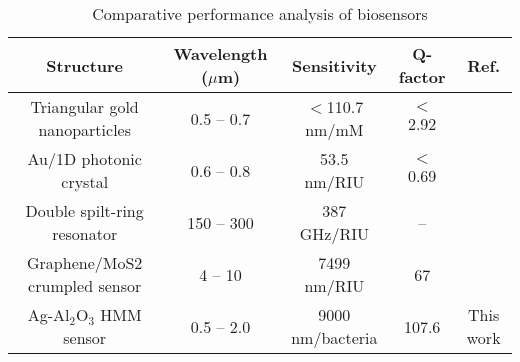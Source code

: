 \begin{table*}[htbp]
\caption{Comparative performance analysis of biosensors}
\begin{center}

\begin{tabular}{c c c c c}
\hline
Structure & Wavelength ($\mu$m) & Sensitivity &  Q-factor & Ref. \\
\hline
Triangular gold nanoparticles & 0.5 -- 0.7 & $<$110.7 nm/mM & $<$ 2.92 & \cite{Chowdhury} \\

Au/1D photonic crystal & 0.6 -- 0.8 & 53.5 nm/RIU & $<$ 0.69 & \cite{Ahmed} \\

Double spilt-ring resonator & 150 -- 300 & 387 GHz/RIU & -- & \cite{Nine} \\ 

Graphene/MoS2 crumpled sensor & 4 -- 10 & 7499 nm/RIU & 67 & \cite{vahid} \\

Ag-Al$_2$O$_3$ HMM sensor & 0.5 -- 2.0 & 9000 nm/bacteria & 107.6 & This work \\
\hline
\end{tabular}
\label{Tab:1}
\end{center}
\end{table*}
